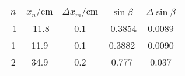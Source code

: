 \begin{tabular}{c|c|c||c|c}
    $n$ & $x_n/\si\cm$ & $\Delta x_m/\si\cm$ & $\sin\beta$ & $\Delta\sin\beta$ \\
    \hline
    -1& -11.8& 0.1 & -0.3854 & 0.0089 \\
    1 & 11.9 & 0.1 & 0.3882 & 0.0090 \\
    2 & 34.9 & 0.2 & 0.777 & 0.037 \\
\end{tabular}

